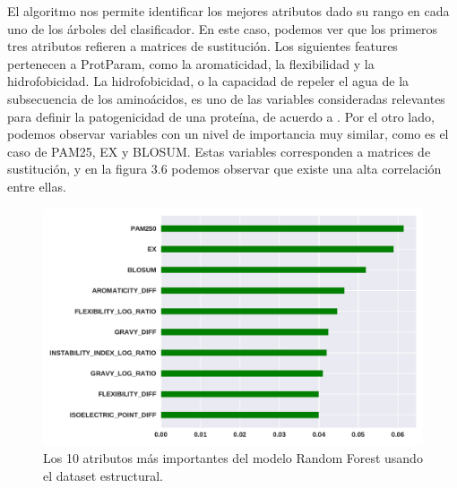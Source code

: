 
El algoritmo nos permite identificar los mejores atributos dado su rango en cada uno de los árboles del clasificador. En este caso, podemos ver que los primeros tres atributos refieren a matrices de sustitución. Los siguientes features pertenecen a ProtParam, como la aromaticidad, la flexibilidad y la hidrofobicidad. La hidrofobicidad, o la capacidad de repeler el agua de la subsecuencia de los aminoácidos, es uno de las variables consideradas relevantes para definir la patogenicidad de una proteína, de acuerdo a \cite{Wang2016}. Por el otro lado, podemos observar variables con un nivel de importancia muy similar, como es el caso de PAM25, EX y BLOSUM. Estas variables corresponden a matrices de sustitución, y en la figura 3.6 podemos observar que existe una alta correlación entre ellas.  

\begin{figure}[H]
    \centering
    \includegraphics[scale=0.55]{documents/latex/figures/3/importance_1.pdf}
    \caption{Los 10 atributos más importantes del modelo Random Forest usando el dataset estructural. }
    \label{fig:importance_1}
\end{figure}


